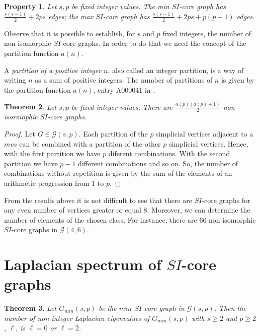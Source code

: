 \documentclass[preprint,12pt]{elsarticle}
\newtheorem{theorem}{Theorem}
\newtheorem{property}[theorem]{Property}
\begin{document}
\begin{property}\label{edges}
Let $s,p$ be fixed integer values.
The min $SI$-core graph  has $\frac{s(s-1)}{2} +2ps$ edges;
the max $SI$-core graph has $\frac{s(s-1)}{2} +2ps+ p(p-1)$ edges.
\end{property}



Observe that it is possible to establish, for $s$  and $p$  fixed integers,  the number of non-isomorphic $SI$-core graphs.
In order to do that we need the concept of the partition function $a(n)$. 

A \textit{partition of a positive integer $n$},
also called an integer partition, is a way of writing $n$ as a sum of positive integers.
The number of partitions of $n$ is given by the partition function $a(n)$, entry A000041 in \cite{oeis}.

\begin{theorem}\label{theo:counting}
Let $s,p$ be fixed integer values.
There are $\frac{a(p)(a(p)+1)}{2}$ non-isormophic $SI$-core graphs.  
\end{theorem}
\begin{proof}
Let $G \in {\mathcal G}(s,p)$.
Each partition of the $p$ simplicial vertices adjacent to a $mvs$ can be combined
with a partition of the other $p$ simplicial vertices.
Hence, with the first partition we have $p$ diferent combinations.
With the second partition we have $p-1$ different combinations  and so on.
So, the number of combinations without repetition is given by 
the sum of the elements of an arithmetic progression from 1 to  $p$. 
\end{proof}

From the results above it is not difficult to see that there are $SI$-core graphs for
any even number of vertices greater or equal 8.
Moreover, we can determine the number of elements of the chosen class.
For instance,  there are 66 non-isomorphic $SI$-core graphs in ${\mathcal G}(4,6)$.






\section{Laplacian spectrum of $SI$-core graphs}

\begin{theorem}\label{theo:principal}
Let $G_{min}(s,p)$ be the $min$ $SI$-core graph in $\mathcal{G}(s,p)$. 
Then the number of non integer Laplacian eigenvalues of $G_{min}(s,p)$ with $s \geq 2$ and $p \geq 2$, $\ell$, is
$ \ell = 0$ or $ \ell = 2$.
\end{theorem}
\end{document}
